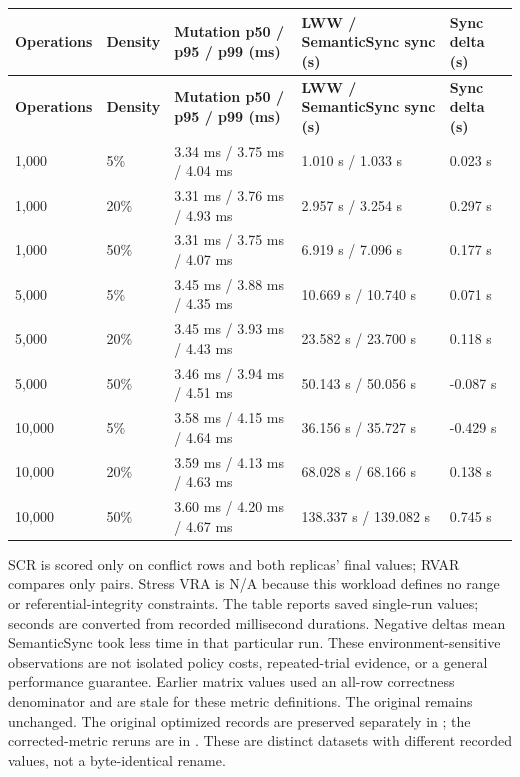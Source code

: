 \documentclass[runningheads]{llncs}
\begin{document}
\begin{longtable}{p{}p{}p{}p{}p{}}
\textbf{Operations} & \textbf{Density} & \textbf{Mutation p50 / p95 / p99 (ms)} & \textbf{LWW / SemanticSync sync (s)} & \textbf{Sync delta (s)} \\\hline
\endfirsthead\hline \textbf{Operations} & \textbf{Density} & \textbf{Mutation p50 / p95 / p99 (ms)} & \textbf{LWW / SemanticSync sync (s)} & \textbf{Sync delta (s)} \\\hline\endhead
1,000 & 5\% & 3.34 ms / 3.75 ms / 4.04 ms & 1.010 s / 1.033 s & 0.023 s \\
1,000 & 20\% & 3.31 ms / 3.76 ms / 4.93 ms & 2.957 s / 3.254 s & 0.297 s \\
1,000 & 50\% & 3.31 ms / 3.75 ms / 4.07 ms & 6.919 s / 7.096 s & 0.177 s \\
5,000 & 5\% & 3.45 ms / 3.88 ms / 4.35 ms & 10.669 s / 10.740 s & 0.071 s \\
5,000 & 20\% & 3.45 ms / 3.93 ms / 4.43 ms & 23.582 s / 23.700 s & 0.118 s \\
5,000 & 50\% & 3.46 ms / 3.94 ms / 4.51 ms & 50.143 s / 50.056 s & -0.087 s \\
10,000 & 5\% & 3.58 ms / 4.15 ms / 4.64 ms & 36.156 s / 35.727 s & -0.429 s \\
10,000 & 20\% & 3.59 ms / 4.13 ms / 4.63 ms & 68.028 s / 68.166 s & 0.138 s \\
10,000 & 50\% & 3.60 ms / 4.20 ms / 4.67 ms & 138.337 s / 139.082 s & 0.745 s \\
\end{longtable}
SCR is scored only on conflict rows and both replicas' final values; RVAR compares only \texttt{} pairs. Stress VRA is N/A because this workload defines no range or referential-integrity constraints. The table reports saved single-run values; seconds are converted from recorded millisecond durations. Negative deltas mean SemanticSync took less time in that particular run. These environment-sensitive observations are not isolated policy costs, repeated-trial evidence, or a general performance guarantee. Earlier matrix values used an all-row correctness denominator and are stale for these metric definitions. The original \texttt{} remains unchanged. The original optimized records are preserved separately in \texttt{}; the corrected-metric reruns are in \texttt{}. These are distinct datasets with different recorded values, not a byte-identical rename.
\end{document}
